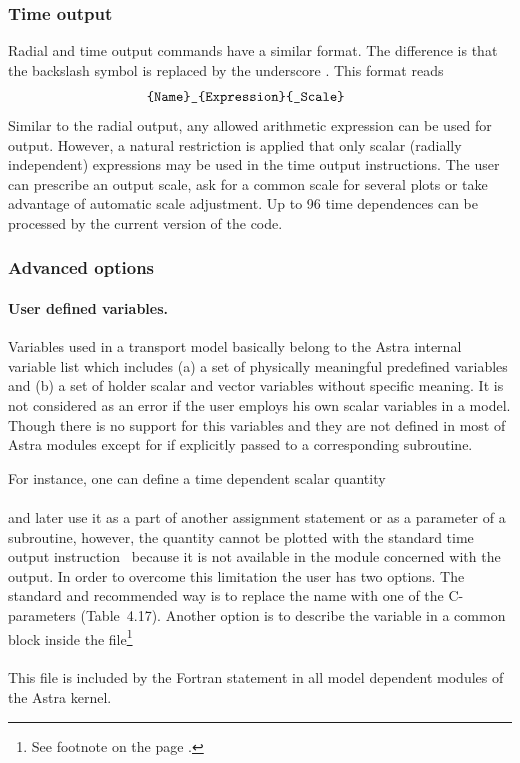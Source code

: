 \subsubsection{Time output}
Radial and time output commands have a similar format.
The difference is that the backslash symbol 
 is replaced by the underscore
. 
This format reads
\begin{equation}\label{Timout}
\mbox{\tt\symbol{123}Name\symbol{125}\us\symbol{123}Expression\symbol{125}\symbol{123}\us Scale\symbol{125}}\qquad
\end{equation}
Similar to the radial output, any allowed arithmetic expression can be
used for output. 
However, a natural restriction is applied that only scalar (radially
independent) expressions may be used in the time output instructions. 
The user can prescribe an output scale, ask for a common scale for several
plots or take advantage of automatic scale adjustment. 
Up to 96 time dependences can be processed by the current version of the
code. 

\subsubsection{Advanced options}

\paragraph{User defined variables.}

Variables used in a transport model basically belong to the Astra
internal variable list which includes (a) a set of physically meaningful
predefined variables and (b) a set of holder scalar and vector variables
without specific meaning. 
It is not considered as an error if the user employs his own scalar
variables in a model. 
Though there is no support for this variables and they are not defined 
in most of Astra modules except for if explicitly passed to a
corresponding subroutine.

For instance, one can define a time dependent scalar quantity\\
\hspace*{15mm}
\\ 
and later use it as a part of another assignment statement or as a
parameter of a subroutine, however, the quantity  cannot be
plotted with the standard time output instruction~ because it
is not available in the module concerned with the output.
In order to overcome this limitation the user has two options.
The standard and recommended way is to replace the name  with
one of the C-parameters (Table~4.17).
Another option is to describe the variable  in a common
block inside the file\footnote{See footnote on the page \pageref{AWD}.}
\\ 
\hspace*{3cm}
 \\
This file is included by the Fortran statement  in all
model dependent modules of the Astra kernel.

